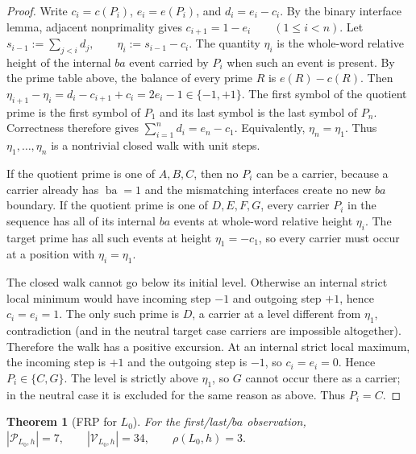 \documentclass[11pt,a4paper]{article}
\newtheorem{theorem}{Theorem}[section]
\newcommand{\Pcal}{\mathcal P}
\newcommand{\Vcal}{\mathcal V}
\begin{document}
\begin{proof}
Write $c_i=c(P_i)$, $e_i=e(P_i)$, and $d_i=e_i-c_i$.  By the binary
interface lemma, adjacent nonprimality gives
\(c_{i+1}=1-e_i \qquad(1\le i<n).\)
Let
\(s_{i-1}:=\sum_{j<i}d_j, \qquad \eta_i:=s_{i-1}-c_i.\)
The quantity $\eta_i$ is the whole-word relative height of the internal $ba$ event carried by $P_i$ when such an event is present.  By the prime table above, the balance of every prime $R$ is $e(R)-c(R)$.  Then
\(\eta_{i+1}-\eta_i =d_i-c_{i+1}+c_i =2e_i-1\in\{-1,+1\}.\)
The first symbol of the quotient prime is the first symbol of $P_1$
and its last symbol is the last symbol of $P_n$.  Correctness therefore gives
\(\sum_{i=1}^n d_i=e_n-c_1.\)
Equivalently,
\(\eta_n=\eta_1.\)
Thus $\eta_1,\ldots,\eta_n$ is a nontrivial closed walk with unit steps.

If the quotient prime is one of $A,B,C$, then no $P_i$ can be a carrier,
because a carrier already has $\operatorname{ba}=1$ and the mismatching
interfaces create no new $ba$ boundary.  If the quotient prime is one
of $D,E,F,G$, every carrier $P_i$ in the sequence has all of its
internal $ba$ events at whole-word relative height $\eta_i$.  The target
prime has all such events at height $\eta_1=-c_1$, so every carrier must
occur at a position with $\eta_i=\eta_1$.

The closed walk cannot go below its initial level.  Otherwise an
internal strict local minimum would have incoming step $-1$ and outgoing
step $+1$, hence $c_i=e_i=1$.  The only such prime is $D$, a carrier at
a level different from $\eta_1$, contradiction (and in the neutral
target case carriers are impossible altogether).  Therefore the walk
has a positive excursion.  At an internal strict local maximum, the
incoming step is $+1$ and the outgoing step is $-1$, so
$c_i=e_i=0$.  Hence $P_i\in\{C,G\}$.  The level is strictly above
$\eta_1$, so $G$ cannot occur there as a carrier; in the neutral case it
is excluded for the same reason as above.  Thus $P_i=C$.
\end{proof}

\begin{theorem}[FRP for $L_0$]
\label{thm:L0-FRP}
For the first/last/$ba$ observation,
\(|\Pcal_{L_0,h}|=7, \qquad |\Vcal_{L_0,h}|=34, \qquad \rho(L_0,h)=3.\)
\end{theorem}
\end{document}
